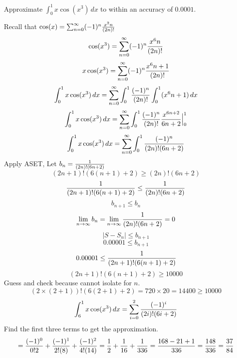 \documentclass[english, 12pt]{article}
\begin{document}
\begin{exmp}
Approximate $\int_0^1 x \cos(x^3)\,dx$ to within an accuracy of $0.0001$.
\begin{sol}
Recall that $\cos(x) = \sum_{n=0}^\infty (-1)^n \frac{x^2n}{(2n)!}$
\[ \cos(x^3) = \sum_{n=0}^\infty (-1)^n \frac{x^6n}{(2n)!}\]
\[ x \cos(x^3) = \sum_{n=0}^\infty (-1)^n \frac{x^6n+1}{(2n)!}\]
\[ \int_0^1 x \cos(x^3)\,dx = \sum_{n=0}^\infty \int_0^1 \frac{(-1)^n}{(2n)!} \int_0^1 (x^6n+1)\,dx\]
\[ \int_0^1 x \cos(x^3)\,dx = \sum_{n=0}^\infty \int_0^1 \frac{(-1)^n}{(2n)!} \frac{x^{6n+2}}{6n+2}\Big|_0^1\]
\[ \int_0^1 x \cos(x^3)\,dx = \sum_{n=0}^\infty \int_0^1 \frac{(-1)^n}{(2n)! (6n+2)}\]
Apply ASET, Let $b_{n} = \frac{1}{(2n)! (6n+2)}$
\[(2n+1)!(6(n+1) + 2 ) \geq (2n)!(6n+2)\]
\[\frac{1}{(2n+1)!(6(n+1) + 2 )} \leq \frac{1}{(2n)!(6n+2)}\]
\[b_{n+1} \leq b_{n}\]
\[\lim_{n\to\infty} b_{n} = \lim_{n\to\infty} \frac{1}{(2n)! (6n+2)} = 0\]
\[|S - S_{n}| \leq b_{n+1}\]
\[ 0.00001 \leq b_{n+1}\]
\[ 0.00001 \leq \frac{1}{(2n+1)!(6(n+1) + 2 )}\]
\[ (2n+1)!(6(n+1) + 2 ) \geq 10000\]
Guess and check because cannot isolate for $n$.
\[ (2\times (2+1))!(6(2+1) + 2 ) = 720\times 20 = 14400 \geq 10000\]
\[\int_6^1 x \cos (x^3)\,dx = \sum_{i=0}^2 \frac{(-1)^i}{(2i)! (6i+2)}\]
Find the first three terms to get the approximation.
\[ = \frac{(-1)^0}{0! 2} + \frac{(-1)^1}{2!(8)} + \frac{(-1)^2}{4! (14)} = \frac{1}{2} + \frac{1}{16} + \frac{1}{336} = \frac{168-21 + 1}{336} = \frac{148}{336} = \frac{37}{84}\]
\end{sol}
\end{exmp}

\end{document}
